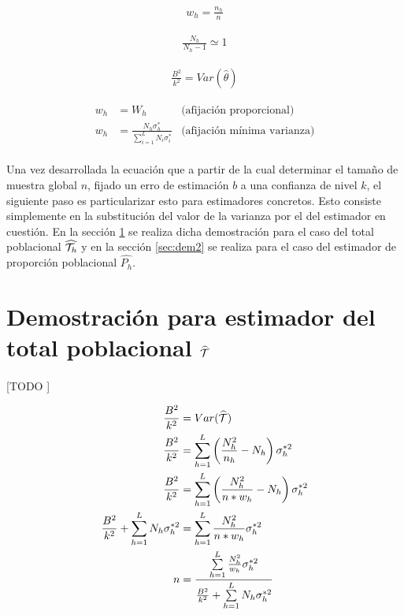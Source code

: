 \documentclass{article}
\begin{document}
    \begin{align}
      w_h = \frac{n_h}{n}
    \end{align}

    \begin{align}
      \frac{N_h}{N_h -1} \simeq 1
    \end{align}

    \begin{align}
      \frac{B^2}{k^2} = Var(\widehat{\theta})
    \end{align}

    \begin{align}
      w_h &= W_h &\text{(afijación proporcional)}\\
      w_h &= \frac{N_h\sigma_h^*}{\sum\limits_{i=1}^LN_i\sigma_i^*}&\text{(afijación mínima varianza)}
    \end{align}

    \paragraph{}
    Una vez desarrollada la ecuación que a partir de la cual determinar el tamaño de muestra global $n$, fijado un erro de estimación $b$ a una confianza de nivel $k$, el siguiente paso es particularizar esto para estimadores concretos. Esto consiste simplemente en la substitución del valor de la varianza por el del estimador en cuestión. En la sección \ref{sec:dem1} se realiza dicha demostración para el caso del total poblacional $\widehat{\mathcal{T}_h}$ y en la sección \ref{sec:dem2} se realiza para el caso del estimador de proporción poblacional $\widehat{P_h}$.


  \section{Demostración para estimador del total poblacional $\widehat{\mathcal{T}}$}
  \label{sec:dem1}
    \paragraph{}
    [TODO ]

    \begin{align}
      \frac{B^2}{k^2} &= Var(\widehat{\mathcal{T}}) \\
      \frac{B^2}{k^2} &= \sum\limits_{h=1}^L\left(\frac{N_h^2}{n_h}- N_h\right)\sigma_h^{*2} \\
      \frac{B^2}{k^2} &= \sum\limits_{h=1}^L\left(\frac{N_h^2}{n*w_h}- N_h\right)\sigma_h^{*2} \\
      \frac{B^2}{k^2} + \sum\limits_{h=1}^L N_h \sigma_h^{*2} &=  \sum\limits_{h=1}^L\frac{N_h^2}{n*w_h}\sigma_h^{*2} \\
      n &=  \frac{\sum\limits_{h=1}^L\frac{N_h^2}{w_h}\sigma_h^{*2}}{\frac{B^2}{k^2} + \sum\limits_{h=1}^L N_h \sigma_h^{*2}} \\
    \end{align}
\end{document}
